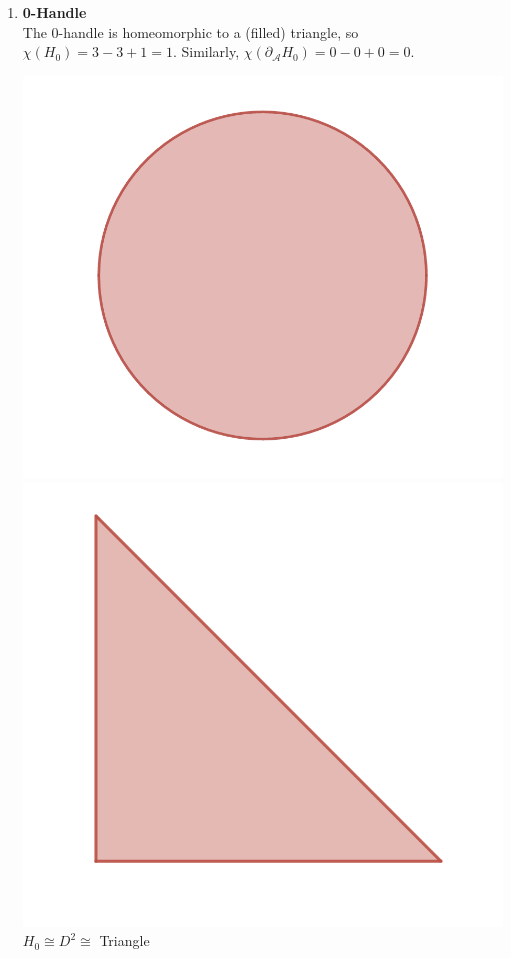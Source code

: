 \documentclass[12pt]{article}
\newcommand{\cA}{{\mathcal A}}
\theoremstyle{definition}
\begin{document}
\begin{enumerate}
      \item \textbf{0-Handle}\\
            The 0-handle is homeomorphic to a (filled) triangle, so $\chi(H_0) = 3 - 3 + 1 = 1$. Similarly, $\chi(\partial_\cA H_0) = 0-0+0 = 0$. 
			\begin{center}
				\includegraphics[scale=0.4]{H_0.png} \includegraphics[scale=0.4]{triangle.png} \\
				$H_0 \cong D^2 \cong $ Triangle
				

\end{center}
\end{enumerate}
\end{document}
